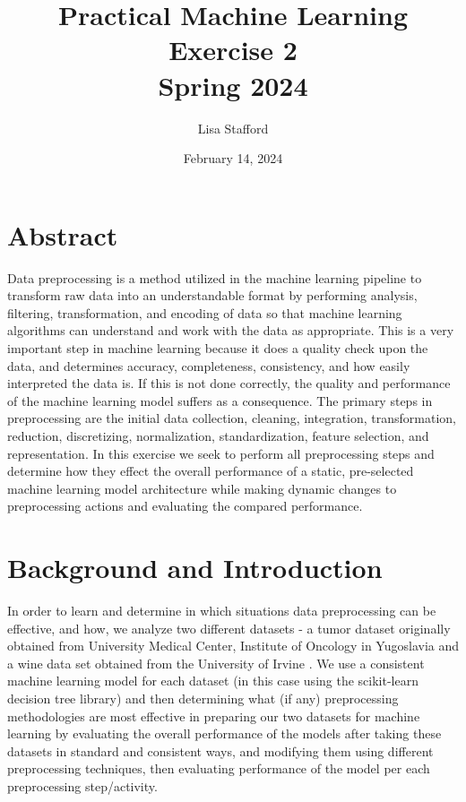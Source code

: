 \documentclass[titlepage]{article}
\title{%
	Practical Machine Learning\\
	
	\vspace*{2em}
	\LARGE Exercise 2 \\
	Spring 2024}
\author{Lisa Stafford}
\date{February 14, 2024}
\begin{document}
\maketitle

\captionsetup{
	format = plain,
	font = footnotesize,
	labelfont = sc
}

\section*{Abstract}
Data preprocessing is a method utilized in the machine learning pipeline to transform raw data into an understandable format by performing  analysis, filtering, transformation, and encoding of data so that machine learning algorithms can understand and work with the data as appropriate.  This is a very important step in machine learning because it does a quality check upon the data, and determines accuracy, completeness, consistency, and how easily interpreted the data is.  If this is not done correctly, the quality and performance of the machine learning model suffers as a consequence.  The primary steps in preprocessing are the initial data collection, cleaning, integration, transformation, reduction, discretizing, normalization, standardization, feature selection, and representation.  In this exercise we seek to perform all preprocessing steps and determine how they effect the overall performance of a static, pre-selected machine learning model architecture while making dynamic changes to preprocessing actions and evaluating the compared performance.   

\section*{Background and Introduction}
In order to learn and determine in which situations data preprocessing can be effective, and how, we analyze two different datasets - a tumor dataset originally obtained from University Medical Center, Institute of Oncology in Yugoslavia  \cite{dataset1} and a wine data set obtained from the University of Irvine \cite{dataset2}.  We use a consistent machine learning model for each dataset (in this case using the scikit-learn decision tree library) and then determining what (if any) preprocessing methodologies are most effective in preparing our two datasets for machine learning by evaluating the overall performance of the models after taking these datasets in standard and consistent ways, and modifying them using different preprocessing techniques, then evaluating performance of the model per each preprocessing step/activity.  
\end{document}
